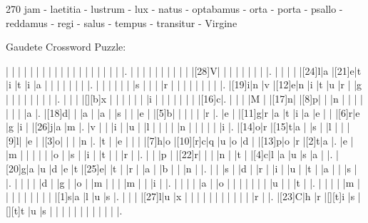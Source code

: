 \documentclass[12pt]{article}
\begin{document}
\pagestyle{fancy}
\fancyhf{}
\renewcommand{\headrulewidth}{0pt}
\renewcommand{\footrulewidth}{0pt}
\libertine
\renewcommand\PuzzleClueFont{\rm\normalsize}
\noindent\begin{rotate}{0}
\small
\end{rotate}
\hfill
\begin{rotate}{270}
\small jam - laetitia - lustrum - lux - natus - optabamus - orta - porta - psallo - reddamus - regi - salus - tempus - transitur - Virgine
\end{rotate}
\begin{center}
  \huge{Gaudete Crossword Puzzle:}
\end{center}
\vspace{1.5cm}
\begin{Puzzle}{20}{22}
  |{}  |{}  |{}  |{}  |{}  |{}  |{}  |{}  |{}  |{}  |{}  |{}  |{}  |{}  |{}  |{}  |{}  |{}  |{}  |.
  |{}  |{}  |{}  |{}  |{}  |{}  |{}  |{}  |{}  |{}  |[28]V|{}  |{}  |{}  |{}  |{}  |{}  |{}  |{}  |.
  |{}  |{}  |{}  |{}  |[24]l|a   |[21]e|t   |i   |t   |i   |a   |{}  |{}  |{}  |{}  |{}  |{}  |{}  |.
  |{}  |{}  |{}  |{}  |{}  |{}  |s   |{}  |{}  |{}  |r   |{}  |{}  |{}  |{}  |{}  |{}  |{}  |{}  |.
  |[19]i|n   |v   |[12]e|n   |i   |t   |u   |r   |{}  |g   |{}  |{}  |{}  |{}  |{}  |{}  |{}  |{}  |.
  |{}  |{}  |{}  |[][b]x   |{}  |{}  |{}  |{}  |{}  |{}  |i   |{}  |{}  |{}  |{}  |{}  |{}  |{}  |[16]c|.
  |{}  |{}  |{}  |M   |{}  |[17]n|{}  |[8]p|{}  |{}  |n   |{}  |{}  |{}  |{}  |{}  |{}  |{}  |a   |.
  |[18]d|{}  |{}  |a   |{}  |a   |{}  |s   |{}  |{}  |e   |{}  |[5]b|{}  |{}  |{}  |{}  |{}  |r   |.
  |e   |{}  |[11]g|r   |a   |t   |i   |a   |e   |{}  |{}  |[6]r|e   |g   |i   |{}  |[26]j|a   |m   |.
  |v   |{}  |{}  |i   |{}  |u   |{}  |l   |{}  |{}  |{}  |{}  |n   |{}  |{}  |{}  |{}  |{}  |i   |.
  |[14]o|r   |[15]t|a   |{}  |s   |{}  |l   |{}  |{}  |[9]l|{}  |e   |{}  |[3]o|{}  |{}  |{}  |n   |.
  |t   |{}  |e   |{}  |{}  |{}  |[7]h|o   |[10][r]c|q   |u   |o   |d   |{}  |[13]p|o   |r   |[2]t|a   |.
  |e   |{}  |m   |{}  |{}  |{}  |{}  |{}  |o   |{}  |s   |{}  |i   |{}  |t   |{}  |{}  |r   |{}  |.
  |{}  |{}  |p   |{}  |[22]r|{}  |{}  |{}  |n   |{}  |t   |{}  |[4]c|l   |a   |u   |s   |a   |{}  |.
  |[20]g|a   |u   |d   |e   |t   |[25]e|{}  |t   |{}  |r   |{}  |a   |{}  |b   |{}  |{}  |n   |{}  |.
  |{}  |{}  |s   |{}  |d   |{}  |r   |{}  |i   |{}  |u   |{}  |t   |{}  |a   |{}  |{}  |s   |{}  |.
  |{}  |{}  |{}  |{}  |d   |{}  |g   |{}  |o   |{}  |m   |{}  |{}  |{}  |m   |{}  |{}  |i   |{}  |.
  |{}  |{}  |{}  |{}  |a   |{}  |o   |{}  |{}  |{}  |{}  |{}  |{}  |{}  |u   |{}  |{}  |t   |{}  |.
  |{}  |{}  |{}  |{}  |m   |{}  |{}  |{}  |{}  |{}  |{}  |{}  |{}  |{}  |[1]s|a   |l   |u   |s   |.
  |{}  |{}  |{}  |[27]l|u   |x   |{}  |{}  |{}  |{}  |{}  |{}  |{}  |{}  |{}  |{}  |{}  |r   |{}  |.
  |[23]C|h   |r   |[][t]i   |s   |[][t]t   |u   |s   |{}  |{}  |{}  |{}  |{}  |{}  |{}  |{}  |{}  |{}  |{}  |.
\end{Puzzle}
\end{document}
